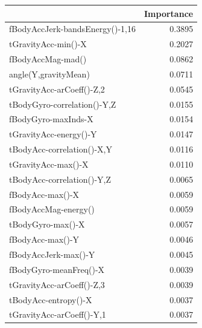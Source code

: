\begin{tabular}{lr}
\toprule
 & Importance \\
\midrule
fBodyAccJerk-bandsEnergy()-1,16 & 0.3895 \\
tGravityAcc-min()-X & 0.2027 \\
fBodyAccMag-mad() & 0.0862 \\
angle(Y,gravityMean) & 0.0711 \\
tGravityAcc-arCoeff()-Z,2 & 0.0545 \\
tBodyGyro-correlation()-Y,Z & 0.0155 \\
fBodyGyro-maxInds-X & 0.0154 \\
tGravityAcc-energy()-Y & 0.0147 \\
tBodyAcc-correlation()-X,Y & 0.0116 \\
tGravityAcc-max()-X & 0.0110 \\
tBodyAcc-correlation()-Y,Z & 0.0065 \\
fBodyAcc-max()-X & 0.0059 \\
fBodyAccMag-energy() & 0.0059 \\
tBodyGyro-max()-X & 0.0057 \\
fBodyAcc-max()-Y & 0.0046 \\
fBodyAccJerk-max()-Y & 0.0045 \\
fBodyGyro-meanFreq()-X & 0.0039 \\
tGravityAcc-arCoeff()-Z,3 & 0.0039 \\
tBodyAcc-entropy()-X & 0.0037 \\
tGravityAcc-arCoeff()-Y,1 & 0.0037 \\
\bottomrule
\end{tabular}
